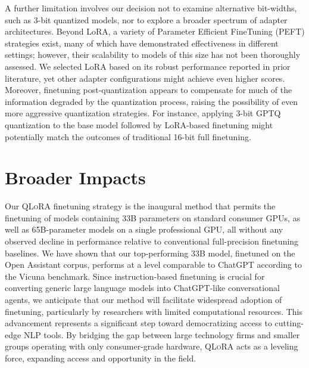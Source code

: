 A further limitation involves our decision not to examine alternative bit-widths, such as 3-bit quantized models, nor to explore a broader spectrum of adapter architectures. Beyond LoRA, a variety of Parameter Efficient FineTuning (PEFT) strategies exist, many of which have demonstrated effectiveness in different settings; however, their scalability to models of this size has not been thoroughly assessed. We selected LoRA based on its robust performance reported in prior literature, yet other adapter configurations might achieve even higher scores. Moreover, finetuning post-quantization appears to compensate for much of the information degraded by the quantization process, raising the possibility of even more aggressive quantization strategies. For instance, applying 3-bit GPTQ quantization to the base model followed by LoRA-based finetuning might potentially match the outcomes of traditional 16-bit full finetuning.

\section{Broader Impacts}

Our \textsc{QLoRA} finetuning strategy is the inaugural method that permits the finetuning of models containing 33B parameters on standard consumer GPUs, as well as 65B-parameter models on a single professional GPU, all without any observed decline in performance relative to conventional full-precision finetuning baselines. We have shown that our top-performing 33B model, finetuned on the Open Assistant corpus, performs at a level comparable to ChatGPT according to the Vicuna benchmark. Since instruction-based finetuning is crucial for converting generic large language models into ChatGPT-like conversational agents, we anticipate that our method will facilitate widespread adoption of finetuning, particularly by researchers with limited computational resources. This advancement represents a significant step toward democratizing access to cutting-edge NLP tools. By bridging the gap between large technology firms and smaller groups operating with only consumer-grade hardware, \textsc{QLoRA} acts as a leveling force, expanding access and opportunity in the field.


